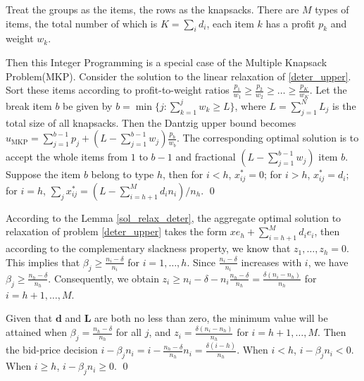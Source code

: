 \begin{pf}
  Treat the groups as the items, the rows as the knapsacks. There are $M$ types of items, the total number of which is $K = \sum_{i} d_i$, each item $k$ has a profit $p_k$ and weight $w_k$. 
  
  Then this Integer Programming is a special case of the Multiple Knapsack Problem(MKP). Consider the solution to the linear relaxation of \eqref{deter_upper}. Sort these items according to profit-to-weight ratios $\frac{p_1}{w_1} \geq \frac{p_2}{w_2} \geq \ldots \geq \frac{p_K}{w_K}$. 
  Let the break item $b$ be given by $b=\min \{j: \sum_{k=1}^j w_k \geq L\}$, where $L = \sum_{j=1}^{N} L_j$ is the total size of all knapsacks. Then the Dantzig upper bound \cite{dantzig1957discrete} becomes $u_{\mathrm{MKP}}=\sum_{j=1}^{b-1} p_j+\left(L-\sum_{j=1}^{b-1} w_j\right) \frac{p_b}{w_b}$. The corresponding optimal solution is to accept the whole items from $1$ to $b-1$ and fractional $(L-\sum_{j=1}^{b-1} w_j)$ item $b$. Suppose the item $b$ belong to type $h$, then for $i < h$, $x_{ij}^{*} = 0$; for $i > h$, $x_{ij}^{*} = d_{i}$; for $i = h$, $\sum_{j} x_{ij}^{*} = (L - \sum_{i = h+1}^{M} {d_i n_i})/ n_h$. \qed
\end{pf}

\begin{pf}
  According to the Lemma \ref{sol_relax_deter}, the aggregate optimal solution to relaxation of problem \eqref{deter_upper} takes the form $x e_{h} + \sum_{i=h+1} ^{M} d_{i} e_{i}$, then according to the complementary slackness property, we know that $z_1, \ldots, z_h = 0$. This implies that $\beta_j \geq \frac{n_i - \delta}{n_i}$ for $i = 1,\ldots, h$. Since $\frac{n_i - \delta}{n_i}$ increases with $i$, we have $\beta_j \geq \frac{n_h - \delta}{n_h}$. Consequently, we obtain $z_{i} \geq n_i - \delta - n_i \frac{n_h - \delta}{n_h} = \frac{\delta(n_i-n_h)}{n_h}$ for $i = h+1, \ldots, M$.
  
  Given that $\mathbf{d}$ and $\mathbf{L}$ are both no less than zero, the minimum value will be attained when $\beta_j = \frac{n_h - \delta}{n_h}$ for all $j$, and $z_i = \frac{\delta(n_i-n_h)}{n_h}$ for $i = h+1, \ldots, M$. Then the bid-price decision $i -\beta_{j} n_i = i - \frac{n_h -\delta}{n_h} n_i = \frac{\delta (i-h)}{n_h}$. When $i < h$, $i -\beta_{j} n_i <0$. When $i \geq h$, $i -\beta_{j} n_i \geq 0$. \qed
  \end{pf}

